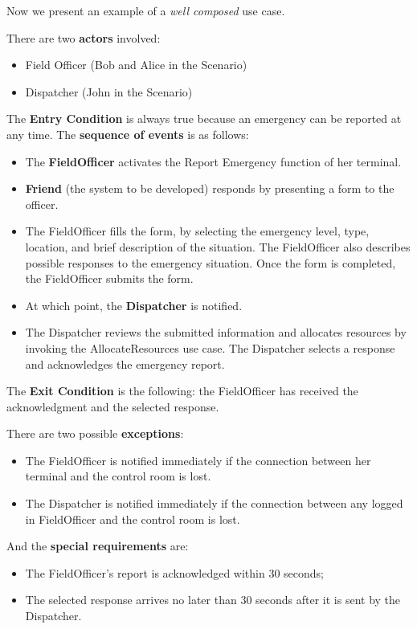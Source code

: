 \noindent
Now we present an example of a \emph{well composed} use case.
\begin{examplebox}
    There are two \textbf{actors} involved:
    \begin{itemize}
        \item Field Officer (Bob and Alice in the Scenario)
        \item Dispatcher (John in the Scenario)
    \end{itemize}
    The \textbf{Entry Condition} is always true because an emergency can be reported at any time. The \textbf{sequence of events} is as follows:
    \begin{itemize}
        \item The \textbf{FieldOfficer} activates the Report Emergency function of her terminal.

        \item \textbf{Friend} (the system to be developed) responds by presenting a form to the officer.
        
        \item The FieldOfficer fills the form, by selecting the emergency level, type, location, and brief description of the situation. The FieldOfficer also describes possible responses to the emergency situation. Once the form is completed, the FieldOfficer submits the form.
        
        \item At which point, the \textbf{Dispatcher} is notified.
        
        \item The Dispatcher reviews the submitted information and allocates resources by invoking the AllocateResources use case. The Dispatcher selects a response and acknowledges the emergency report.
    \end{itemize}
    The \textbf{Exit Condition} is the following: the FieldOfficer has received the acknowledgment and the selected response.

    \highspace
    There are two possible \textbf{exceptions}:
    \begin{itemize}
        \item The FieldOfficer is notified immediately if the connection between her terminal and the control room is lost.
        \item The Dispatcher is notified immediately if the connection between any logged in FieldOfficer and the control room is lost.
    \end{itemize}
    And the \textbf{special requirements} are:
    \begin{itemize}
        \item The FieldOfficer's report is acknowledged within 30 seconds;
        \item The selected response arrives no later than 30 seconds after it is sent by the Dispatcher.
    \end{itemize}
\end{examplebox}


